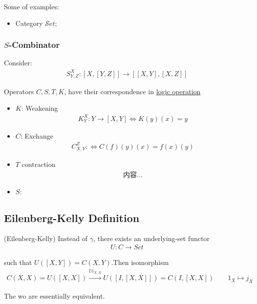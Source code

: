 \documentclass[Total.tex]{subfiles}
\begin{document}
				Some of examples:
				\begin{example}
					\begin{itemize}
						\item Category $\mathcal Set$;
					\end{itemize}
				\end{example}
				\subsubsection{$S$-Combinator}
				\begin{Def}
					Consider:
					\begin{gather*}
						S_{Y,Z}^X:[X,[Y,Z]]\rightarrow [[X,Y],[X,Z]]
					\end{gather*}
				\end{Def}
				
				Operators $C,S,T,K$, have their correspondence in \underline{logic operation}
				
				\begin{itemize}
					\item $K$: Weakening
					\begin{gather*}
						K^X_Y:Y\rightarrow [X,Y]\Leftrightarrow K(y)(x)=y
					\end{gather*}
					
					\item $C$: Exchange
					\begin{gather*}
						C_{X,Y}^Z:\Leftrightarrow C(f)(y)(x)=f(x)(y)
					\end{gather*}
					
					\item $T$ contraction
					\begin{gather*}
						内容...
					\end{gather*}
					
					\item $S$:
					
				\end{itemize}
			\subsection{Eilenberg-Kelly Definition}
			\begin{Def}
				(Eilenberg-Kelly) Instead of $\gamma$, there exists an underlying-set functor
				\begin{gather*}
					U:C\rightarrow Set
				\end{gather*}
		 
				such that $U([X,Y])=C(X,Y)$.Then isomorphism 
				\begin{gather*}
					C(X,X)=U([X,X])\stackrel{Ui_{X,X}}{\rightarrow} U([I,[X,X]])=C(I,[X,X])\qquad 1_X\mapsto j_X
				\end{gather*}
				
				The wo are essentially equivalent.
			\end{Def}
\end{document}
